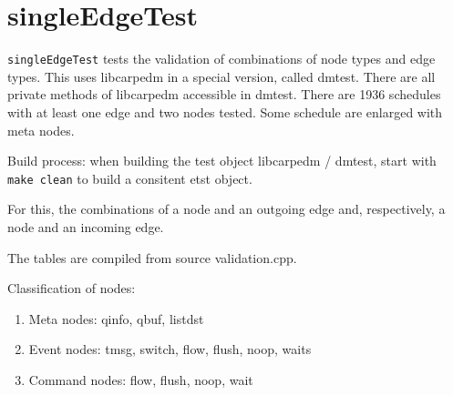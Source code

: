 \section{singleEdgeTest}
\texttt{singleEdgeTest} tests the validation of combinations of node types and edge types. This uses libcarpedm in a special version, called dmtest. 
There are all private methods of libcarpedm accessible in dmtest. There are 1936 schedules
with at least one edge and two nodes tested. Some schedule are enlarged with meta nodes.

Build process: when building the test object libcarpedm / dmtest, start with \texttt{make clean} to build a consitent etst object.

For this, the combinations of a node and an outgoing edge and,
respectively, a node and an incoming edge.

The tables are compiled from source validation.cpp.

Classification of nodes:
\begin{enumerate}
\item Meta nodes: qinfo, qbuf, listdst
\item Event nodes: tmsg, switch, flow, flush, noop, waits
\item Command nodes: flow, flush, noop, wait
\end{enumerate}

